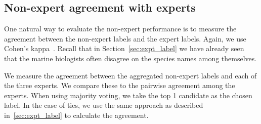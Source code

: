 \subsection{Non-expert agreement with experts}
One natural way to evaluate the non-expert performance is to measure
the agreement between the non-expert labels and the expert labels.
%
Again, we use Cohen's kappa~\cite{Cohen60}.  %
%
%
Recall that in Section~\ref{sec:expt_label} we have already seen that the marine biologists often disagree on 
the species names %
among themselves. 
%

We measure the agreement between the aggregated non-expert labels and each of the 
three experts. We compare these to the pairwise agreement among the experts. 
When using majority voting, we take the top 1 candidate as the chosen label. 
In the case of ties, we use the same approach as described in~\ref{sec:expt_label} to 
calculate the agreement. 

%
%




